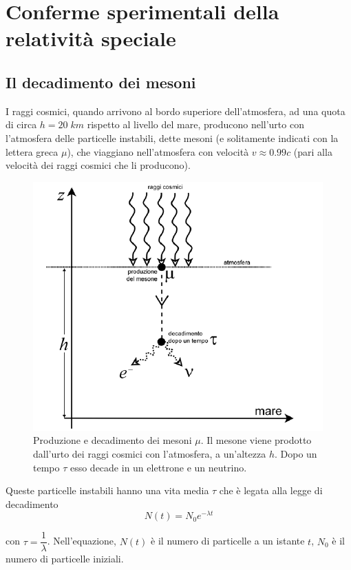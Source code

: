 \chapter{Conferme sperimentali della relatività speciale}
\minitoc

\section{Il decadimento dei mesoni}

I raggi cosmici, quando arrivono al bordo superiore dell'atmosfera, ad una quota di 
circa $h = 20\;km$ rispetto al livello del mare, producono nell'urto con
l'atmosfera delle particelle instabili, dette mesoni (e solitamente indicati con
la lettera greca $\mu$), che viaggiano nell'atmosfera con velocità $v \approx 0.99c$ 
(pari alla velocità dei raggi cosmici che li producono). 

\begin{figure}[htbp]
   \centering
   \includegraphics[scale=1]{immagini/conferme_relspec/produzione_mu}
   \caption{\label{produzione_mu}Produzione e decadimento dei mesoni $\mu$. Il mesone viene prodotto 
dall'urto dei raggi cosmici con l'atmosfera, a un'altezza $h$. Dopo un
tempo $\tau$ esso decade in un elettrone e un neutrino.}
\end{figure}

Queste particelle instabili hanno una vita media $\tau$ che è legata alla legge di decadimento
\begin{equation}
N(t) = N_0 e^{-\lambda t}
\end{equation}

con $\tau = \dfrac{1}{\lambda}$. Nell'equazione, $N(t)$ è il numero di particelle a un
istante $t$, $N_0$ è il numero di particelle iniziali.

